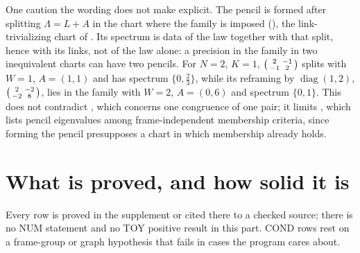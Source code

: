 One caution the wording does not make explicit. The pencil is formed after splitting \(\Lambda=L+A\) in
the chart where the family is imposed (), the link-trivializing chart of
. Its spectrum is data of the law together with that split, hence with
its links, not of the law alone: a precision in the family in two inequivalent charts can have two
pencils. For \(N=2\), \(K=1\), \(\begin{psmallmatrix}2&-1\\-1&2\end{psmallmatrix}\) splits with \(W=1\),
\(A=(1,1)\) and has spectrum \(\{0,\tfrac23\}\), while its reframing by \(\operatorname{diag}(1,2)\),
\(\begin{psmallmatrix}2&-2\\-2&8\end{psmallmatrix}\), lies in the family with \(W=2\), \(A=(0,6)\) and
spectrum \(\{0,1\}\). This does not contradict , which concerns one
congruence of one pair; it limits , which lists pencil
eigenvalues among frame-independent membership criteria, since forming the pencil presupposes a chart in
which membership already holds.

\section{What is proved, and how solid it is}
\label{comp:sg1-scorecard}

Every row is proved in the supplement or cited there to a checked source; there is no NUM statement and
no TOY positive result in this part. COND rows rest on a frame-group or graph hypothesis that fails in
cases the program cares about.

